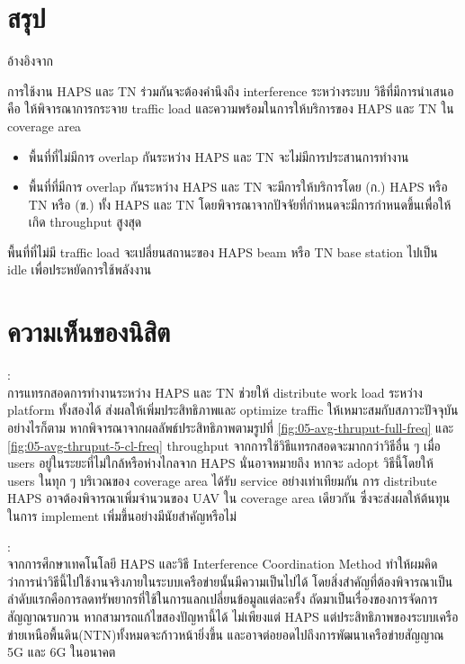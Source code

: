 \section{สรุป}

อ้างอิงจาก \cite[Interference Coordination Method for Integrated HAPS-Terrestrial Networks]{liu2021interference}

การใช้งาน HAPS และ TN ร่วมกันจะต้องคำนึงถึง interference ระหว่างระบบ
วิธีที่มีการนำเสนอคือ ให้พิจารณาการกระจาย traffic load และความพร้อมในการให้บริการของ
HAPS และ TN ใน coverage area

\begin{itemize}
    \item พื้นที่ที่ไม่มีการ overlap กันระหว่าง HAPS และ TN จะไม่มีการประสานการทำงาน
    \item พื้นที่ที่มีการ overlap กันระหว่าง HAPS และ TN จะมีการให้บริการโดย (ก.) HAPS หรือ TN หรือ (ข.) ทั้ง HAPS และ TN
            โดยพิจารณาจากปัจจัยที่กำหนดจะมีการกำหนดขึ้นเพื่อให้เกิด throughput สูงสุด
\end{itemize}

พื้นที่ที่ไม่มี traffic load จะเปลี่ยนสถานะของ HAPS beam หรือ TN base station ไปเป็น idle เพื่อประหยัดการใช้พลังงาน

\section{ความเห็นของนิสิต}

\begin{multicols}{2}
\begin{minipage}{0.4\textwidth}
\textbf{\authorAName}:\\
การแทรกสอดการทำงานระหว่าง HAPS และ TN ช่วยให้ distribute work load
ระหว่าง platform ทั้งสองได้ ส่งผลให้เพิ่มประสิทธิภาพและ optimize traffic
ให้เหมาะสมกับสภาวะปัจจุบัน อย่างไรก็ตาม หากพิจารณาจากผลลัพธ์ประสิทธิภาพตามรูปที่ 
\ref{fig:05-avg-thruput-full-freq} และ \ref{fig:05-avg-thruput-5-cl-freq}
throughput จากการใช้วิธีแทรกสอดจะมากกว่าวิธีอื่น ๆ เมื่อ users อยู่ในระยะที่ไม่ใกล้หรือห่างไกลจาก HAPS
นั่นอาจหมายถึง หากจะ adopt วิธีนี้โดยให้ users ในทุก ๆ บริเวณของ coverage area
ได้รับ service อย่างเท่าเทียมกัน การ distribute HAPS อาจต้องพิจารณาเพิ่มจำนวนของ
UAV ใน coverage area เดียวกัน ซึ่งจะส่งผลให้ต้นทุนในการ implement เพิ่มขึ้นอย่างมีนัยสำคัญหรือไม่
\end{minipage}

\columnbreak

\begin{minipage}{0.4\textwidth}
\textbf{\authorBName}:\\
จากการศึกษาเทคโนโลยี HAPS และวิธี Interference Coordination Method ทำให้ผมคิดว่าการนำวิธีนี้ไปใช้งานจริงภายในระบบเครือข่ายนั้นมีความเป็นไปได้ 
โดยสิ่งสำคัญที่ต้องพิจารณาเป็นลำดับแรกคือการลดทรัพยากรที่ใช้ในการแลกเปลี่ยนข้อมูลแต่ละครั้ง ถัดมาเป็นเรื่องของการจัดการสัญญาณรบกวน
หากสามารถแก้ไขสองปัญหานี้ได้ ไม่เพียงแต่ HAPS แต่ประสิทธิภาพของระบบเครือข่ายเหนือพื้นดิน(NTN)ทั้งหมดจะก้าวหน้ายิ่งขึ้น 
และอาจต่อยอดไปถึงการพัฒนาเครือข่ายสัญญาณ 5G และ 6G ในอนาคต
\end{minipage}
\end{multicols}

